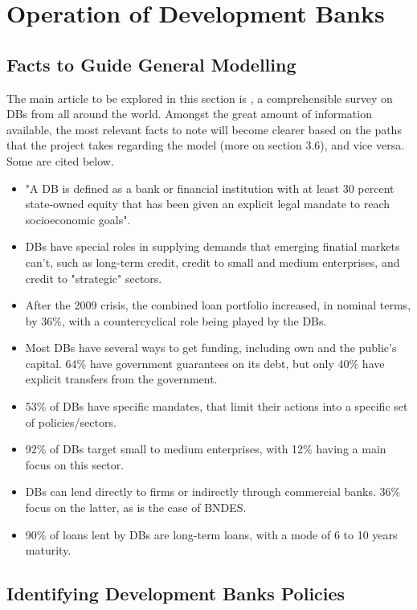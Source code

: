 \documentclass[12pt]{article}
\begin{document}
\section{Operation of Development Banks}

\subsection{Facts to Guide General Modelling}

The main article to be explored in this section is \cite{martinez_2012}, a comprehensible survey on DBs from all around the world. Amongst the great amount of information available, the most relevant facts to note will become clearer based on the paths that the project takes regarding the model (more on section 3.6), and vice versa. Some are cited below.

\begin{itemize}
    \item "A DB is defined as a bank or financial institution with at least 30 percent state-owned equity that has been given an explicit legal mandate to reach socioeconomic goals".
    \item DBs have special roles in supplying demands that emerging finatial markets can't, such as long-term credit, credit to small and medium enterprises, and credit to "strategic" sectors.
    \item After the 2009 crisis, the combined loan portfolio increased, in nominal terms, by 36\%, with a countercyclical role being played by the DBs.
    \item Most DBs have several ways to get funding, including own and the public's capital. 64\% have government guarantees on its debt, but only 40\% have explicit transfers from the government.
    \item 53\% of DBs have specific mandates, that limit their actions into a specific set of policies/sectors.
    \item 92\% of DBs target small to medium enterprises, with 12\% having a main focus on this sector.
    \item DBs can lend directly to firms or indirectly through commercial banks. 36\% focus on the latter, as is the case of BNDES.
    \item 90\% of loans lent by DBs are long-term loans, with a mode of 6 to 10 years maturity.
\end{itemize}


\subsection{Identifying Development Banks Policies}
\end{document}

